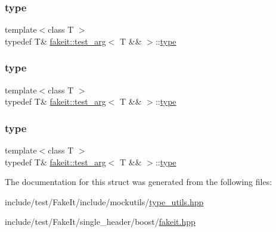 \subsubsection{\texorpdfstring{type}{type}\hspace{0.1cm}{\footnotesize\ttfamily [7/9]}}
{\footnotesize\ttfamily template$<$class T $>$ \\
typedef T\& \mbox{\hyperlink{structfakeit_1_1test__arg}{fakeit\+::test\+\_\+arg}}$<$ T \&\& $>$\+::\mbox{\hyperlink{structfakeit_1_1test__arg_3_01T_01_6_6_01_4_aaace2782c3dd97bd31e137f8c7c47f5f}{type}}}

\mbox{\label{structfakeit_1_1test__arg_3_01T_01_6_6_01_4_aaace2782c3dd97bd31e137f8c7c47f5f}} 
\subsubsection{\texorpdfstring{type}{type}\hspace{0.1cm}{\footnotesize\ttfamily [8/9]}}
{\footnotesize\ttfamily template$<$class T $>$ \\
typedef T\& \mbox{\hyperlink{structfakeit_1_1test__arg}{fakeit\+::test\+\_\+arg}}$<$ T \&\& $>$\+::\mbox{\hyperlink{structfakeit_1_1test__arg_3_01T_01_6_6_01_4_aaace2782c3dd97bd31e137f8c7c47f5f}{type}}}

\mbox{\label{structfakeit_1_1test__arg_3_01T_01_6_6_01_4_aaace2782c3dd97bd31e137f8c7c47f5f}} 
\subsubsection{\texorpdfstring{type}{type}\hspace{0.1cm}{\footnotesize\ttfamily [9/9]}}
{\footnotesize\ttfamily template$<$class T $>$ \\
typedef T\& \mbox{\hyperlink{structfakeit_1_1test__arg}{fakeit\+::test\+\_\+arg}}$<$ T \&\& $>$\+::\mbox{\hyperlink{structfakeit_1_1test__arg_3_01T_01_6_6_01_4_aaace2782c3dd97bd31e137f8c7c47f5f}{type}}}



The documentation for this struct was generated from the following files\+:\begin{DoxyCompactItemize}
\item 
include/test/\+Fake\+It/include/mockutils/\mbox{\hyperlink{type__utils_8hpp}{type\+\_\+utils.\+hpp}}\item 
include/test/\+Fake\+It/single\+\_\+header/boost/\mbox{\hyperlink{single__header_2boost_2fakeit_8hpp}{fakeit.\+hpp}}\end{DoxyCompactItemize}
